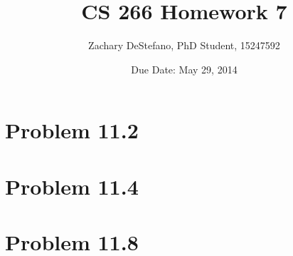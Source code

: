 \documentclass[11pt,psfig]{article}
\begin{document}
\setlength{\parskip}{1.2ex plus0.3ex minus 0.3ex}


\thispagestyle{empty} \pagestyle{myheadings} 



\title{CS 266 Homework 7}
\author{Zachary DeStefano, PhD Student, 15247592}
\date{Due Date: May 29, 2014}

\maketitle

\vfill\eject

\section*{Problem 11.2}



\section*{Problem 11.4}

\section*{Problem 11.8}
\end{document}
